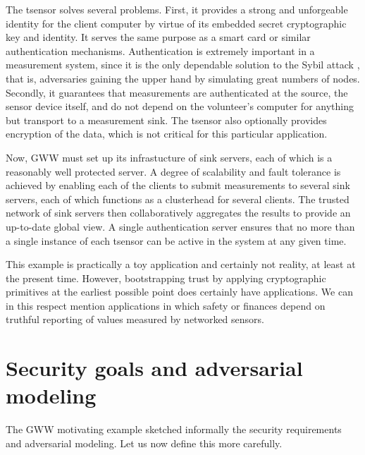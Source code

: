 The tsensor solves several problems. First, it provides a strong and unforgeable identity for the client computer by virtue of its embedded secret cryptographic key and identity. It serves the same purpose as a smart card or similar authentication mechanisms. Authentication is extremely important in a measurement system, since it is the only dependable solution to the Sybil attack , that is, adversaries gaining the upper hand by simulating great numbers of nodes. Secondly, it guarantees that measurements are authenticated at the source, the sensor device itself, and do not depend on the volunteer's computer for anything but transport to a measurement sink. The tsensor also optionally provides encryption of the data, which is not critical for this particular application.

Now, GWW must set up its infrastucture of sink servers, each of which is a reasonably well protected server. A degree of scalability and fault tolerance is achieved by enabling each of the clients to submit measurements to several sink servers, each of which functions as a clusterhead for several clients. The trusted network of sink servers then collaboratively aggregates the results to provide an up-to-date global view. A single authentication server ensures that no more than a single instance of each tsensor can be active in the system at any given time.

This example is practically a toy application and certainly not reality, at least at the present time. However, bootstrapping trust by applying cryptographic primitives at the earliest possible point does certainly have applications. We can in this respect mention applications in which safety or finances depend on truthful reporting of values measured by networked sensors.

\section{Security goals and adversarial modeling}
\label{sec:sec-goals}

The GWW motivating example sketched informally the security requirements and adversarial modeling. Let us now define this more carefully.

